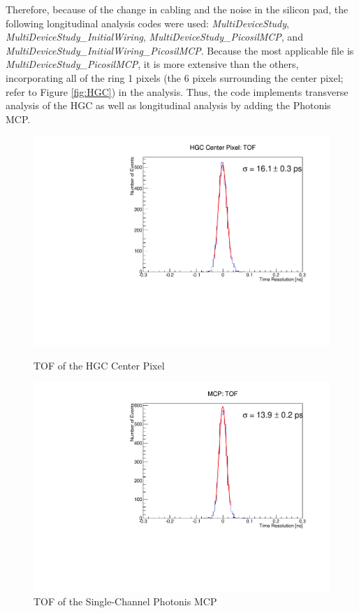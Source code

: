 \documentclass[12pt]{article}
\begin{document}
Therefore, because of the change in cabling and the noise in the silicon pad, the following longitudinal analysis codes were used: \textit{MultiDeviceStudy}, \textit{MultiDeviceStudy\_InitialWiring}, \textit{MultiDeviceStudy\_PicosilMCP}, and \textit{MultiDeviceStudy\_InitialWiring\_PicosilMCP}. 
Because the most applicable file is \textit{MultiDeviceStudy\_PicosilMCP}, it is more extensive than the others, incorporating all of the ring 1 pixels (the 6 pixels surrounding the center pixel; refer to Figure \ref{fig:HGC}) in the analysis. 
Thus, the code implements transverse analysis of the HGC as well as longitudinal analysis by adding the Photonis MCP.

\begin{figure}[h]
\centering
\begin{minipage}[t]{.49\textwidth}
	\centering
	\includegraphics[width=\textwidth]{deltaTCenter.pdf}
	\caption{TOF of the HGC Center Pixel}
	\label{fig:Center}
\end{minipage} \hfill
\begin{minipage}[t]{.49\textwidth}
	\centering
	\includegraphics[width=\textwidth]{deltaTMCP.pdf}
	\caption{TOF of the Single-Channel Photonis MCP}
	\label{fig:MCP}
\end{minipage}
\end{figure}
\end{document}
